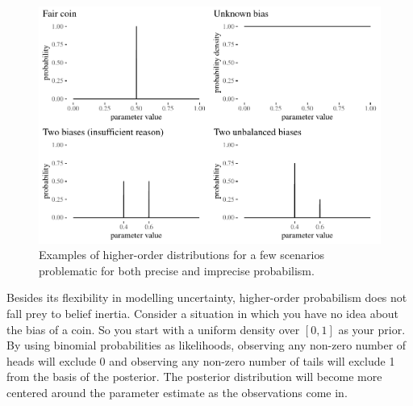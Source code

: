 \documentclass[
  10pt,
  dvipsnames,enabledeprecatedfontcommands]{scrartcl}
\begin{document}
\begin{figure}[t]

\begin{center}\includegraphics[width=0.8\linewidth]{imprecision_philosophical_paper2_files/figure-latex/FigevidenceResponse2-1} \end{center}
\caption{Examples of higher-order distributions for a few  scenarios problematic for both precise and imprecise probabilism.}
\label{fig:evidenceResponse}
\end{figure}

Besides its flexibility in modelling uncertainty, higher-order
probabilism does not fall prey to belief inertia. Consider a situation
in which you have no idea about the bias of a coin. So you start with a
uniform density over \([0,1]\) as your prior. By using binomial
probabilities as likelihoods, observing any non-zero number of heads
will exclude 0 and observing any non-zero number of tails will exclude 1
from the basis of the posterior. The posterior distribution will become
more centered around the parameter estimate as the observations come in.
\end{document}
